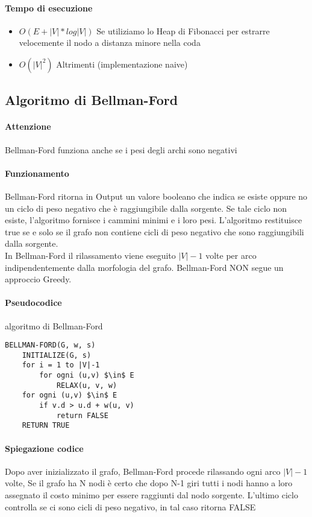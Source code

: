 \documentclass[12pt, a4paper, openany]{book}
\begin{document}
\paragraph{Tempo di esecuzione}
\begin{itemize}
	\item $O(E + |V|*log|V|)$ Se utiliziamo lo Heap di Fibonacci per estrarre velocemente il nodo a distanza minore nella coda
	\item $O(|V|^2)$ Altrimenti (implementazione naive)
\end{itemize}

\subsection{Algoritmo di Bellman-Ford}

\paragraph{Attenzione}
Bellman-Ford funziona anche se i pesi degli archi sono negativi


\paragraph{Funzionamento}
Bellman-Ford ritorna in Output un valore booleano che indica se esiste oppure no un ciclo di peso
negativo che è raggiungibile dalla sorgente. Se tale ciclo non esiste, l'algoritmo fornisce i cammini minimi
e i loro pesi. L'algoritmo restituisce true se e solo se il grafo non contiene cicli di peso negativo che sono
raggiungibili dalla sorgente.\\
In Bellman-Ford il rilassamento viene eseguito $|V|-1$ volte per arco indipendentemente dalla morfologia del grafo.
Bellman-Ford NON segue un approccio Greedy.

\paragraph{Pseudocodice} algoritmo di Bellman-Ford
\begin{lstlisting}[mathescape=true]
BELLMAN-FORD(G, w, s)
    INITIALIZE(G, s)
    for i = 1 to |V|-1
        for ogni (u,v) $\in$ E
            RELAX(u, v, w)
    for ogni (u,v) $\in$ E
        if v.d > u.d + w(u, v)
            return FALSE
    RETURN TRUE
\end{lstlisting}

\paragraph{Spiegazione codice}
Dopo aver inizializzato il grafo, Bellman-Ford procede rilassando ogni arco $|V|-1$ volte,
Se il grafo ha N nodi è certo che dopo N-1 giri tutti i nodi hanno a loro assegnato il costo minimo per essere raggiunti dal nodo sorgente.
L'ultimo ciclo controlla se ci sono cicli di peso negativo, in tal caso ritorna FALSE
\end{document}
